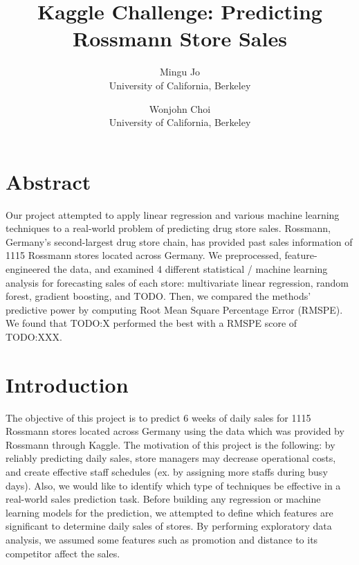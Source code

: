 \documentclass[letterpaper,twocolumn,10pt]{article}
\begin{document}
\date{}

\title{\Large \bf Kaggle Challenge: Predicting Rossmann Store Sales}

\author{
  {\rm Mingu Jo}\\
  University of California, Berkeley
  \and
      {\rm Wonjohn Choi}\\
      University of California, Berkeley
} %

\maketitle

\thispagestyle{empty}


\section{Abstract}
Our project attempted to apply linear regression and various machine learning techniques to a real-world problem of predicting drug store sales. Rossmann, Germany's second-largest drug store chain, has provided past sales information of 1115 Rossmann stores located across Germany. We preprocessed, feature-engineered the data, and examined 4 different statistical / machine learning analysis for forecasting sales of each store: multivariate linear regression, random forest, gradient boosting, and TODO. Then, we compared the methods' predictive power by computing Root Mean Square Percentage Error (RMSPE). We found that TODO:X performed the best with a RMSPE score of TODO:XXX.


\section{Introduction}
The objective of this project is to predict 6 weeks of daily sales for 1115 Rossmann stores located across Germany using the data which was provided by Rossmann through Kaggle. The motivation of this project is the following: by reliably predicting daily sales, store managers may decrease operational costs, and create effective staff schedules (ex. by assigning more staffs during busy days). Also, we would like to identify which type of techniques be effective in a real-world sales prediction task. Before building any regression or machine learning models for the prediction, we attempted to define which features are significant to determine daily sales of stores. By performing exploratory data analysis, we assumed some features such as promotion and distance to its competitor affect the sales. %
\end{document}
